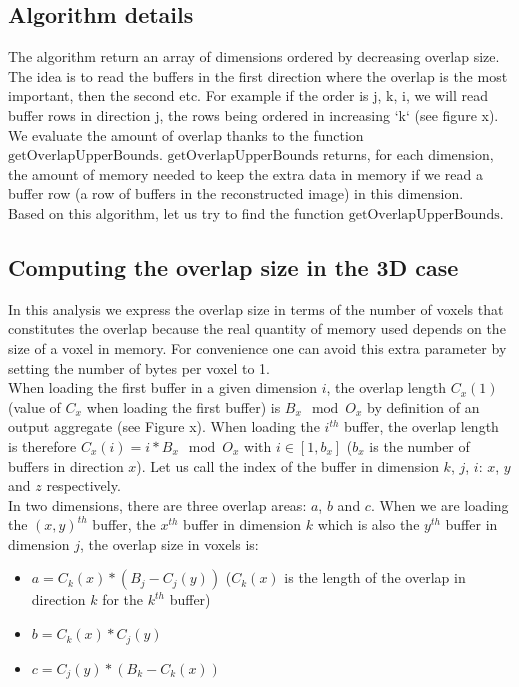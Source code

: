 \documentclass[conference]{IEEEtran}
\begin{document}
\subsection{Algorithm details}
The algorithm return an array of dimensions ordered by decreasing overlap size.
The idea is to read the buffers in the first direction where the overlap is the most important, then the second etc.
For example if the order is j, k, i, we will read buffer rows in direction j, the rows being ordered in increasing `k` (see figure x).
We evaluate the amount of overlap thanks to the function $\textrm{getOverlapUpperBounds}$.
$\textrm{getOverlapUpperBounds}$ returns, for each dimension, the amount of memory needed to keep the extra data in memory if we read a buffer row (a row of buffers in the reconstructed image) in this dimension. \\

\noindent Based on this algorithm, let us try to find the function $\textrm{getOverlapUpperBounds}$.

\subsection{Computing the overlap size in the 3D case}
In this analysis we express the overlap size in terms of the number of voxels that constitutes the overlap because the real quantity of memory used depends on the size of a voxel in memory.
For convenience one can avoid this extra parameter by setting the number of bytes per voxel to 1. \\

When loading the first buffer in a given dimension $i$, the overlap length $C_{x}(1)$ (value of $C_x$ when loading the first buffer) is $B_x \mod O_x$ by definition of an output aggregate (see Figure x).
When loading the $i^{th}$ buffer, the overlap length is therefore $C_{x}(i) = i * B_x \mod O_x$ with $i \in [1, b_x]$ ($b_x$ is the number of buffers in direction $x$).
Let us call the index of the buffer in dimension $k$, $j$, $i$: $x$, $y$ and $z$ respectively. \\

In two dimensions, there are three overlap areas: $a$, $b$ and $c$. When we are loading the $(x, y)^{th}$ buffer, the $x^{th}$ buffer in dimension $k$ which is also the $y^{th}$ buffer in dimension $j$, the overlap size in voxels is:
\begin{itemize}
  \item $a = C_k(x) * (B_j - C_j(y))$ ($C_k(x)$ is the length of the overlap in direction $k$ for the $k^{th}$ buffer)
  \item $b = C_k(x) * C_j(y)$
  \item $c = C_j(y) * (B_k - C_k(x))$
\end{itemize}
\end{document}
